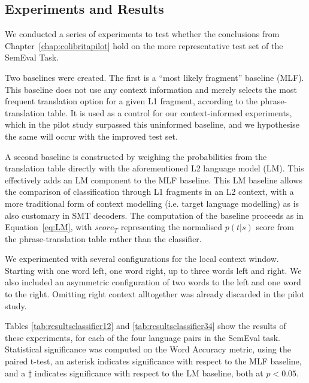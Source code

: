 \subsection{Experiments and Results}

We conducted a series of experiments to test whether the conclusions from
Chapter~\ref{chap:colibritapilot} hold on the more representative test set of
the SemEval Task.

Two baselines were created. The first is a ``most likely fragment'' baseline
(MLF). This baseline does not use any context information and merely selects
the most frequent translation option for a given L1 fragment, according to the
phrase-translation table. It is used as a control for our context-informed
experiments, which in the pilot study surpassed this uninformed baseline, and
we hypothesise the same will occur with the improved test set.

A second baseline is constructed by weighing the probabilities from the
translation table directly with the aforementioned L2 language model (LM). This
effectively adds an LM component to the MLF baseline. This LM baseline allows
the comparison of classification through L1 fragments in an L2 context, with a
more traditional form of context modelling (i.e. target language modelling) as is
also customary in SMT decoders. The computation of the baseline proceeds as in
Equation~\ref{eq:LM}, with $score_T$ representing the normalised $p(t|s)$ score
from the phrase-translation table rather than the classifier.


We experimented with several configurations for the local context window. Starting
with one word left, one word right, up to three words left and right. We also
included an asymmetric configuration of two words to the left and one word to
the right. Omitting right context alltogether was already discarded in the pilot study.

Tables \ref{tab:resultsclassifier12} and \ref{tab:resultsclassifier34} show the
results of these experiments, for each of the four language pairs in the
SemEval task.  Statistical significance was computed on the Word Accuracy
metric, using the paired t-test, an asterisk indicates significance with respect to the
MLF baseline, and a $\ddagger$ indicates significance with respect to the LM baseline, both at $p < 0.05$.

